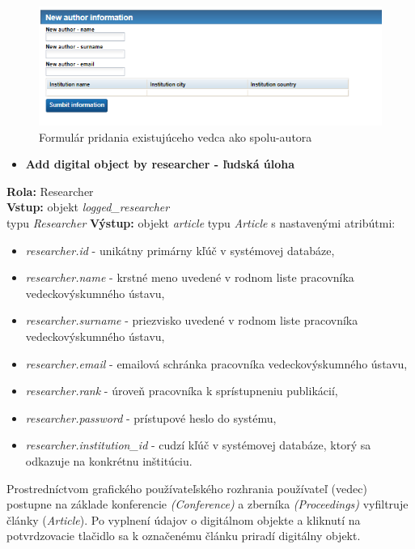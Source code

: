 \documentclass[10pt,oneside,slovak,a4paper]{article}
\begin{document}
\begin{figure} [H]
\centering
\includegraphics[scale=0.4]{forms/new_coauthor.png} 
\caption{Formulár pridania existujúceho vedca ako spolu-autora}
\end{figure}

\begin{itemize}
\item \textbf{Add digital object by researcher - ľudská úloha}
\end{itemize}

\textbf{Rola:} Researcher\\
\textbf{Vstup:} objekt \textit{logged\_researcher}\\ typu \textit{Researcher}
\textbf{Výstup:} objekt \textit{article} typu \textit{Article} s nastavenými atribútmi:

\begin{itemize}
\item \textit{researcher.id} - unikátny primárny kľúč v systémovej databáze,
\item \textit{researcher.name} - krstné meno uvedené v rodnom liste pracovníka vedeckovýskumného ústavu,
\item \textit{researcher.surname} -  priezvisko uvedené v rodnom liste pracovníka vedeckovýskumného ústavu,
\item \textit{researcher.email} - emailová schránka pracovníka vedeckovýskumného ústavu,
\item \textit{researcher.rank} - úroveň pracovníka k sprístupneniu publikácií,
\item \textit{researcher.password} - prístupové heslo do systému,
\item \textit{researcher.institution\_id} - cudzí kľúč v systémovej databáze, ktorý sa odkazuje na konkrétnu inštitúciu.
\end{itemize}

Prostredníctvom grafického používateľského rozhrania používateľ (vedec) postupne na základe konferencie \textit{(Conference)} a zberníka \textit{(Proceedings)} vyfiltruje články (\textit{Article}). Po vyplnení údajov o digitálnom objekte a kliknutí na potvrdzovacie tlačidlo sa k označenému článku priradí digitálny objekt.
\end{document}
